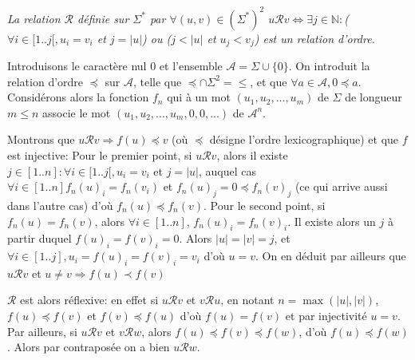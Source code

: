 \documentclass{scrartcl}
\begin{document}
			\prop \textsl{La relation $\mathcal{R}$ définie sur $\Sigma^*$ par $\forall (u,v)\in(\Sigma^*)^2$
			$u\mathcal{R}v \Leftrightarrow \exists j \in \mathbb{N}: $($\forall i \in [1..j[, u_i = v_i$ et $j=|u|$) ou 
			($j < |u|$ et $u_j < v_j$) est un relation d'ordre.}
			\begin{demo}
				\item Introduisons le caractère nul 0 et l'ensemble $\mathcal{A} = \Sigma \cup \{0\}$.
					On introduit la relation d'ordre $\preceq$ sur $\mathcal{A}$, telle que $\preceq\cap\Sigma^2 = \leq$, et 
					que $\forall a \in \mathcal{A}, 0 \preceq a$.
					Considérons alors la fonction $f_n$ qui à un mot $(u_1,u_2,...,u_m)$ de $\Sigma$ de longueur $m \leq n$ associe
					le mot $(u_1,u_2,...,u_m,0,0,...)$ de $\mathcal{A}^n$.
				\item Montrons que $u \mathcal{R}v \Rightarrow f(u) \preceq v$ (où $\preceq$ désigne l'ordre lexicographique) 
					et que $f$ est injective:
					Pour le premier point, si $u \mathcal{R} v$, alors il existe $j \in [1..n] : \forall i \in [1..j[, u_i = v_i$ et $j=|u|$,
					auquel cas $\forall i \in [1..n] f_n(u)_i = f_n(v_i)$ et $f_n(u)_j = 0 \preceq f_n(v)_j$ (ce qui arrive aussi dans l'autre cas)
					d'où $f_n(u) \preceq f_n(v)$.
					Pour le second point, si $f_n(u) = f_n(v)$, alors $\forall i \in [1..n]$, $f_n(u)_i = f_n(v)_i$.
					Il existe alors un $j$ à partir duquel $f(u)_i = f(v)_i = 0$. Alors $|u|=|v|=j$, 
					et $\forall i \in [1..j], u_i=f(u)_i = f(v)_i = v_i$ d'où $u=v$.
					On en déduit par ailleurs que $u\mathcal{R}v$ et $u\neq v \Rightarrow f(u) \prec f(v)$
				\item $\mathcal{R}$ est alors réflexive: en effet si $u\mathcal{R}v$ et $v\mathcal{R}u$,
					en notant $n=\max(|u|,|v|)$, $f(u) \preceq f(v)$ et $f(v) \preceq f(u)$ d'où $f(u)=f(v)$ et par injectivité 
					$u=v$. Par ailleurs, si $u\mathcal{R}v$ et $v\mathcal{R}w$, alors $f(u) \preceq f(v) \preceq f(w)$, d'où 
					$f(u) \preceq f(w)$. Alors par contraposée on a bien $u\mathcal{R}w$. 
			\end{demo}
\end{document}
